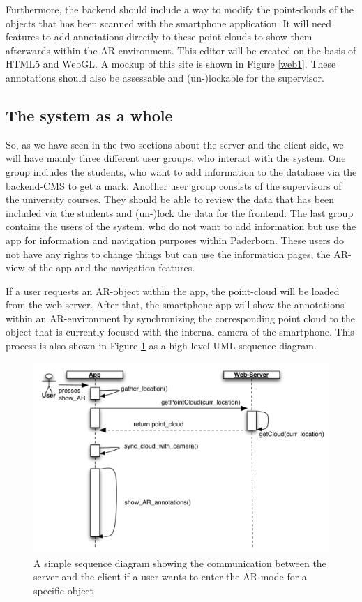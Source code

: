 \documentclass[a4page]{article}
\begin{document}
Furthermore, the backend should include a way to modify the point-clouds of the objects that has been scanned with the smartphone application. It will need features to add annotations directly to these point-clouds to show them afterwards within the \ac{AR}-environment. This editor will be created on the basis of \ac{HTML5} and \ac{WebGL}. A mockup of this site is shown in Figure \ref{web1}. These annotations should also be assessable and (un-)lockable for the supervisor. 

\subsection{The system as a whole}
So, as we have seen in the two sections about the server and the client side, we will have mainly three different user groups, who interact with the system. One group includes the students, who want to add information to the database via the backend-\ac{CMS} to get a mark. Another user group consists of the supervisors of the university courses. They should be able to review the data that has been included via the students and (un-)lock the data for the frontend. The last group contains the users of the system, who do not want to add information but use the app for information and navigation purposes within Paderborn. These users do not have any rights to change things but can use the information pages, the \ac{AR}-view of the app and the navigation features. 

If a user requests an \ac{AR}-object within the app, the point-cloud will be loaded from the web-server. After that, the smartphone app will show the annotations within an \ac{AR}-environment by synchronizing the corresponding point cloud to the object that is currently focused with the internal camera of the smartphone. This process is also shown in Figure \ref{sdia1} as a high level \ac{UML}-sequence diagram.

\begin{figure}[th]
\centerline{\includegraphics[width=1\textwidth]{gfx/sdia1}}
\caption{A simple sequence diagram showing the communication between the server and the client if a user wants to enter the \ac{AR}-mode for a specific object}
\label{sdia1}
\end{figure}
\end{document}
